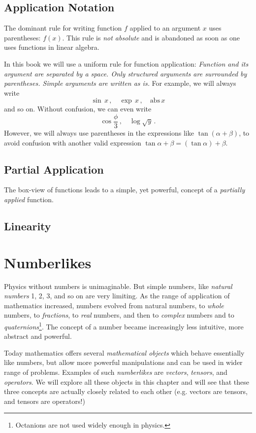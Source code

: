 \subsection{Application Notation}
The dominant rule for writing function $f$ applied to an argument $x$ uses parentheses: $f(x)$. This rule is \emph{not absolute} and is abandoned as soon as one uses functions in linear algebra.

In this book we will use a uniform rule for function application: \emph{Function and its argument are separated by a space. Only structured arguments are surrounded by parentheses. Simple arguments are written as is.} For example, we will always write
\[
\sin\,x\,,\quad \exp\, x\,,\quad \textrm{abs}\,x 
\]
and so on. Without confusion, we can even write 
\[
\cos\frac{\phi}{3}\,,\quad\log\sqrt{y}\,.
\]
However, we will always use parentheses in the expressions like $\tan (\alpha+\beta)$, to avoid confusion with another valid expression $\tan \alpha+\beta=(\tan \alpha)+\beta$.


\subsection{Partial Application}
The box-view of functions leads to a simple, yet powerful, concept of a \emph{partially applied} function.


\subsection{Linearity}


\section{Numberlikes}
Physics without numbers is unimaginable. But simple numbers, like \emph{natural numbers} 1, 2, 3, and so on are very limiting.  As the range of application of mathematics increased, numbers evolved from natural numbers, to \emph{whole} numbers, to \emph{fractions}, to \emph{real} numbers, and then to \emph{complex} numbers and to \emph{quaternions}\footnote{Octanions are not used widely enough in physics.}. The concept of a number became increasingly less intuitive, more abstract and powerful.

Today mathematics offers several \emph{mathematical objects} which behave essentially like numbers, but allow more powerful manipulations and can be used in wider range of problems. Examples of such \emph{numberlikes} are \emph{vectors}, \emph{tensors}, and \emph{operators}. We will explore all these objects in this chapter and will see that these three concepts are actually closely related to each other (e.g. vectors are tensors, and tensors are operators!)



